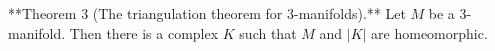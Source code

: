 **Theorem 3 (The triangulation theorem for 3-manifolds).** Let $M$ be a 3-manifold. Then there is a complex $K$ such that $M$ and $|K|$ are homeomorphic.
